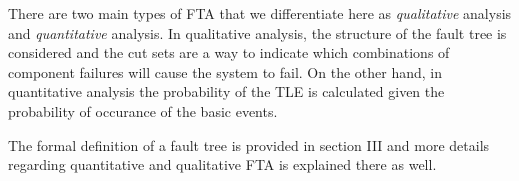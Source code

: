 There are two main types of FTA that we differentiate here as \textit{qualitative} analysis and \textit{quantitative} analysis. In qualitative analysis, the structure of the fault tree is considered and the cut sets are a way to indicate which combinations of component failures will cause the system to fail. On the other hand, in quantitative analysis the probability of the TLE is calculated given the probability of occurance of the basic events. 

The formal definition of a fault tree is provided in section III and more details regarding quantitative and qualitative FTA is explained there as well. 


